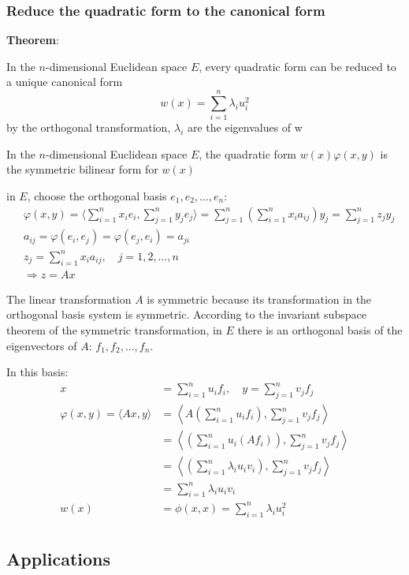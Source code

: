 \subsubsection{Reduce the quadratic form to the canonical form}
\textbf{Theorem}:

In the $n$-dimensional Euclidean space $E$, every quadratic form can be reduced to a unique canonical form 
\[
w(x) = \sum_{i=1}^n \lambda_i u_i^2
\]
by the orthogonal transformation, $\lambda_i$ are the eigenvalues of w

In the $n$-dimensional Euclidean space $E$, the quadratic form $w(x)\varphi(x,y)$ is the symmetric bilinear form for $w(x)$

in $E$, choose the orthogonal basis $e_1, e_2, \ldots, e_n$:
\begin{align*}
    &\varphi(x, y) = \langle\sum_{i=1}^nx_ie_i, \sum_{j=1}^n  y_j e_j\rangle = \sum_{j=1}^n \left(\sum_{i=1}^n x_ia_{ij}\right)y_j = \sum_{j=1}^n z_j y_j\\
    &a_{ij} = \varphi(e_i, e_j) = \varphi(e_j, e_i) = a_{ji}\\
    &z_j = \sum_{i=1}^n x_i a_{ij}, \quad j = 1, 2, \ldots, n\\
    &\Rightarrow z = Ax
\end{align*}

The linear transformation $A$ is symmetric because its transformation in the orthogonal basis system is symmetric. According to the invariant subspace theorem of the symmetric transformation, in $E$ there is an orthogonal basis of the eigenvectors of $A$: $f_1, f_2, \ldots, f_n$.

In this basis:
\begin{align*}
    x &= \sum_{i=1}^n u_i f_i, \quad y = \sum_{j=1}^n v_j f_j\\
    \varphi(x, y) = \langle Ax, y \rangle 
    &= \left\langle A \left(\sum_{i=1}^n u_i f_i\right), \sum_{j=1}^n v_j f_j \right\rangle\\
    &= \left\langle \left(\sum_{i=1}^n u_i (Af_i)\right), \sum_{j=1}^n v_j f_j \right\rangle\\
    &= \left\langle \left(\sum_{i=1}^n \lambda_i u_i v_i\right), \sum_{j=1}^n v_j f_j \right\rangle\\
    &= \sum_{i=1}^n \lambda_i u_i v_i\\
    w(x) &= \phi(x, x) = \sum_{i=1}^n \lambda_i u_i^2\\
\end{align*}

\subsection{Applications}

